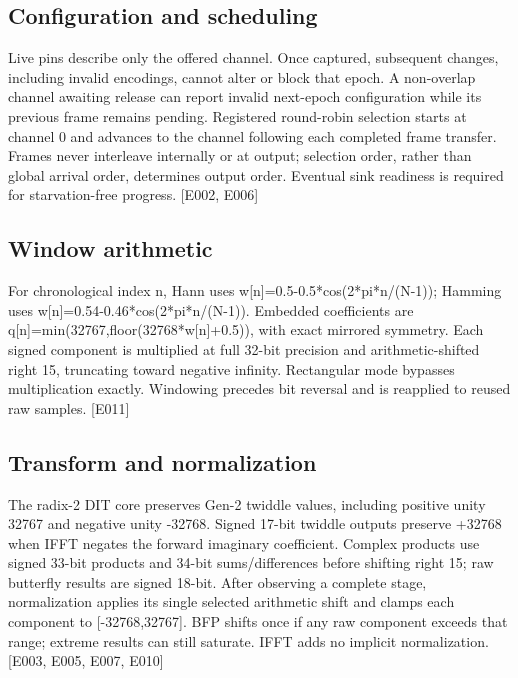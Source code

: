 \documentclass[11pt,a4paper]{article}
\begin{document}
\subsection{Configuration and scheduling}

Live pins describe only the offered channel. Once captured,\allowbreak{} subsequent changes,\allowbreak{} including invalid encodings,\allowbreak{} cannot alter or block that epoch. A non-overlap channel awaiting release can report invalid next-epoch configuration while its previous frame remains pending. Registered round-robin selection starts at channel 0 and advances to the channel following each completed frame transfer. Frames never interleave internally or at output; selection order,\allowbreak{} rather than global arrival order,\allowbreak{} determines output order. Eventual sink readiness is required for starvation-free progress. [\allowbreak{}E002,\allowbreak{} E006]\allowbreak{}

\subsection{Window arithmetic}

For chronological index n,\allowbreak{} Hann uses w[\allowbreak{}n]\allowbreak{}=\allowbreak{}0.5-0.5*\allowbreak{}cos(\allowbreak{}2*\allowbreak{}pi*\allowbreak{}n/\allowbreak{}(\allowbreak{}N-1)\allowbreak{})\allowbreak{}; Hamming uses w[\allowbreak{}n]\allowbreak{}=\allowbreak{}0.54-0.46*\allowbreak{}cos(\allowbreak{}2*\allowbreak{}pi*\allowbreak{}n/\allowbreak{}(\allowbreak{}N-1)\allowbreak{})\allowbreak{}. Embedded coefficients are q[\allowbreak{}n]\allowbreak{}=\allowbreak{}min(\allowbreak{}32767,\allowbreak{}floor(\allowbreak{}32768*\allowbreak{}w[\allowbreak{}n]\allowbreak{}+\allowbreak{}0.5)\allowbreak{})\allowbreak{},\allowbreak{} with exact mirrored symmetry. Each signed component is multiplied at full 32-bit precision and arithmetic-shifted right 15,\allowbreak{} truncating toward negative infinity. Rectangular mode bypasses multiplication exactly. Windowing precedes bit reversal and is reapplied to reused raw samples. [\allowbreak{}E011]\allowbreak{}

\subsection{Transform and normalization}

The radix-2 DIT core preserves Gen-2 twiddle values,\allowbreak{} including positive unity 32767 and negative unity -32768. Signed 17-bit twiddle outputs preserve +\allowbreak{}32768 when IFFT negates the forward imaginary coefficient. Complex products use signed 33-bit products and 34-bit sums/\allowbreak{}differences before shifting right 15; raw butterfly results are signed 18-bit. After observing a complete stage,\allowbreak{} normalization applies its single selected arithmetic shift and clamps each component to [\allowbreak{}-32768,\allowbreak{}32767]\allowbreak{}. BFP shifts once if any raw component exceeds that range; extreme results can still saturate. IFFT adds no implicit normalization. [\allowbreak{}E003,\allowbreak{} E005,\allowbreak{} E007,\allowbreak{} E010]\allowbreak{}
\end{document}
